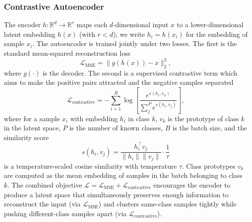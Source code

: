 \subsubsection{Contrastive Autoencoder}
The encoder $h : \mathbb{R}^d \to \mathbb{R}^r$ maps each $d$-dimensional input $x$ to a lower-dimensional latent embedding $h(x)$ (with $r < d$); we write $h_i = h(x_i)$ for the embedding of sample $x_i$. The autoencoder is trained jointly under two losses. The first is the standard mean-squared reconstruction loss
\begin{equation} \label{eq:ncm-mse}
    \mathcal{L}_{\text{MSE}} = \| g(h(x)) - x \|^2_2,
\end{equation}
where $g(\cdot)$ is the decoder. The second is a supervised contrastive term which aims to make the positive pairs attracted and the negative samples separated
\begin{equation} \label{eq:ncm-contrastive}
    \mathcal{L}_{\text{contrastive}} = - \sum_{i=1}^B \log \left[\frac{e^{s(h_i, v_k)}}{\sum_{j}^P e^{s(h_i, v_j)}}\right],
\end{equation}
where for a sample $x_i$ with embedding $h_i$ in class $k$, $v_k$ is the prototype of class $k$ in the latent space, $P$ is the number of known classes, $B$ is the batch size, and the similarity score
\begin{equation}
    s(h_i, v_j) = \frac{h_i^\top v_j}{\|h_i\| \|v_j\|} \cdot \frac{1}{\tau}
\end{equation}
is a temperature-scaled cosine similarity with temperature $\tau$. Class prototypes $v_k$ are computed as the mean embedding of samples in the batch belonging to class $k$. The combined objective $\mathcal{L} = \mathcal{L}_{\text{MSE}} + \mathcal{L}_{\text{contrastive}}$ encourages the encoder to produce a latent space that simultaneously preserves enough information to reconstruct the input (via $\mathcal{L}_{\text{MSE}}$) and clusters same-class samples tightly while pushing different-class samples apart (via $\mathcal{L}_{\text{contrastive}}$).

